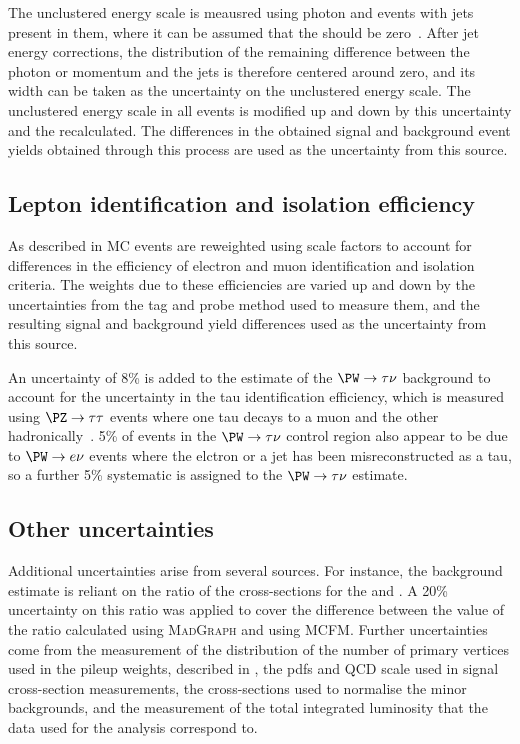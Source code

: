 The unclustered energy scale is meausred using photon and \PZ events with jets present in them, where it can be assumed that the \MET should be zero~\cite{CMS-PAS-JME-12-002}. After jet energy corrections, the distribution of the remaining difference between the photon or \PZ momentum and the jets is therefore centered around zero, and its width can be taken as the uncertainty on the unclustered energy scale. The unclustered energy scale in all events is modified up and down by this uncertainty and the \MET recalculated. The differences in the obtained signal and background event yields obtained through this process are used as the uncertainty from this source.

\subsection{Lepton identification and isolation efficiency}
\label{sec:promptlepweights}
As described in  \ac{MC} events are reweighted using scale factors to account for differences in the efficiency of electron and muon identification and isolation criteria. The weights due to these efficiencies are varied up and down by the uncertainties from the tag and probe method used to measure them, and the resulting signal and background yield differences used as the uncertainty from this source.

An uncertainty of 8\% is added to the estimate of the $\PW\rightarrow\tau\nu$ background to account for the uncertainty in the tau identification efficiency, which is measured using $\PZ\rightarrow\tau\tau$ events where one tau decays to a muon and the other hadronically~\cite{Chatrchyan:1385560}. 5\% of events in the $\PW\rightarrow\tau\nu$ control region also appear to be due to $\PW\rightarrow e\nu$ events where the elctron or a jet has been misreconstructed as a tau, so a further 5\% systematic is assigned to the $\PW\rightarrow\tau\nu$ estimate.


\subsection{Other uncertainties}
\label{sec:promptzextrap}
Additional uncertainties arise from several sources. For instance, the \Znunu background estimate is reliant on the ratio of the cross-sections for the \Znunu and \Zmumu. A 20\% uncertainty on this ratio was applied to cover the difference between the value of the ratio calculated using \textsc{MadGraph} and using \textsc{MCFM}. Further uncertainties come from the measurement of the distribution of the number of primary vertices used in the pileup weights, described in , the \ac{pdf}s and \ac{QCD} scale used in signal cross-section measurements, the cross-sections used to normalise the minor backgrounds, and the measurement of the total integrated luminosity that the data used for the analysis correspond to.


